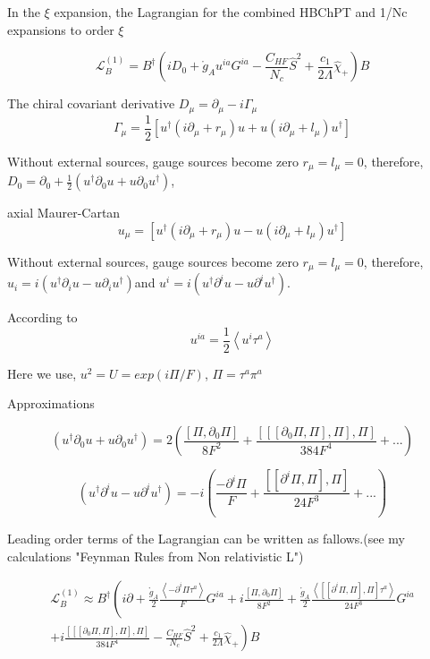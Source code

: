 \documentclass{article}
\newcommand{\bea}{\begin{eqnarray}}
\newcommand{\eea}{\end{eqnarray}}
\begin{document}
In the $\xi $ expansion, the Lagrangian for the combined HBChPT and 1/Nc expansions to order $\xi$

$$ \mathcal{L}_{B}^{(1)} = B^{\dag} \left( iD_0 + \mathring{g}_A u^{ia} G^{ia} -\frac{C_{HF}}{N_c} \hat{S}^2 +\frac{c_1}{2 \Lambda } \hat{\chi}_+ \right) B $$ 

\cite{Fernando2018} \cite{Fernando2020} \cite{Cordon2013}

The chiral covariant derivative $ D_{\mu} = \partial_{\mu} -i \Gamma_{\mu}$
$$ \Gamma_{\mu} = \frac{1}{2} \left[  u^{\dag} (i\partial_{\mu} +r_{\mu}) u + u (i\partial_{\mu}+l_{\mu} ) u^{\dag} \right] $$

Without external sources, gauge sources become zero $ r_{\mu} = l_{\mu} =0 $, therefore, $D_{0} =\partial_{0}+ \frac{1}{2} \left(  u^{\dag} \partial_{0} u + u \partial_{0} u^{\dag} \right)   $, 

\vspace{5mm}
axial Maurer-Cartan
$$ u_{\mu} = \left[  u^{\dag} (i\partial_{\mu} +r_{\mu}) u - u (i\partial_{\mu}+l_{\mu} ) u^{\dag} \right]   $$

Without external sources, gauge sources become zero $ r_{\mu} = l_{\mu} =0 $, therefore, $u_i =i \left(  u^{\dag} \partial_{i} u - u \partial_{i} u^{\dag} \right)   $and  $u^i =i \left(  u^{\dag} \partial^{i} u - u \partial^{i} u^{\dag} \right)   $.

\vspace{5mm}
According to \cite{CalleCordon2014} 
$$ u^{ia} = \frac{1}{2} \left< u^i \tau ^a \right> $$

\vspace{5mm}
Here we use, $u^{2}= U = exp(i \Pi/F) $, $ \Pi = \tau^{a} \pi^{a} $


Approximations

$$ \left(  u^{\dag} \partial_0 u + u \partial_0 u^{\dag} \right) = 
2\left( \frac{ \left[\Pi,\partial_0\Pi \right] }{8F^2} 
+ \frac{ \left[\left[\left[\partial_0\Pi,\Pi \right],\Pi \right],\Pi \right] }{384F^4} +... \right) $$

$$ \left(  u^{\dag} \partial^i u - u \partial^i u^{\dag} \right) = -i
\left( \frac{ -\partial^i \Pi }{F} 
+ \frac{ \left[\left[\partial^i\Pi,\Pi \right],\Pi \right] }{24F^3} +... \right) $$


\vspace{5mm}
Leading order terms of the Lagrangian can be written as fallows.(see my calculations "Feynman Rules from Non relativistic L") 

\bea
\mathcal{L}_{B}^{(1)} \approx B^{\dag} \left( i\partial
+\frac{\mathring{g}_A}{2} \frac{ \left< -\partial^i\Pi\tau^a \right> }{F}  G^{ia} 
+ i\frac{ \left[\Pi,\partial_0 \Pi \right] }{8F^2} 
+\frac{\mathring{g}_A}{2} \frac{ \left<  \left[\left[\partial^i\Pi,\Pi \right],\Pi \right] \tau^a \right>  }{24F^3}  G^{ia}  
\right.
\nonumber\\
\left.
+i\frac{ \left[\left[\left[\partial_0\Pi,\Pi \right],\Pi \right],\Pi \right] }{384F^4}
-\frac{C_{HF}}{N_c} \hat{S}^2 +\frac{c_1}{2 \Lambda } \hat{\chi}_+ \right) B
\nonumber
\eea
\end{document}
